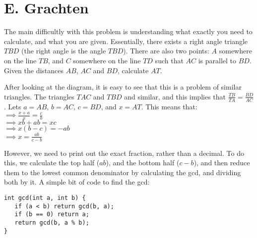 \section*{E. Grachten}

The main difficultly with this problem is understanding what exactly you need to calculate, and what you are given. Essentially, there exists a right angle triangle $TBD$ (the right angle is the angle $TBD$). There are also two points: $A$ somewhere on the line $TB$, and $C$ somewhere on the line $TD$ such that $AC$ is parallel to $BD$. Given the distances $AB$, $AC$ and $BD$, calculate $AT$.

After looking at the diagram, it is easy to see that this is a problem of similar triangles. The triangles $TAC$ and $TBD$ and similar, and this implies that $\frac{TB}{TA} = \frac{BD}{AC}$. Lets $a = AB$, $b = AC$, $c = BD$, and $x = AT$. This means that:
\\
 $\implies \frac{x + a}{x} = \frac{c}{b}$
\\
$\implies xb + ab = xc$
\\
$\implies x(b - c) = -ab$
\\
$\implies x = \frac{ab}{c - b}$

However, we need to print out the exact fraction, rather than a decimal. To do this, we calculate the top half ($ab$), and the bottom half ($c - b$), and then reduce them to the lowest common denominator by calculating the gcd, and dividing both by it. A simple bit of code to find the gcd:

\begin{verbatim}
int gcd(int a, int b) {
   if (a < b) return gcd(b, a);
   if (b == 0) return a;
   return gcd(b, a % b);
}
\end{verbatim}